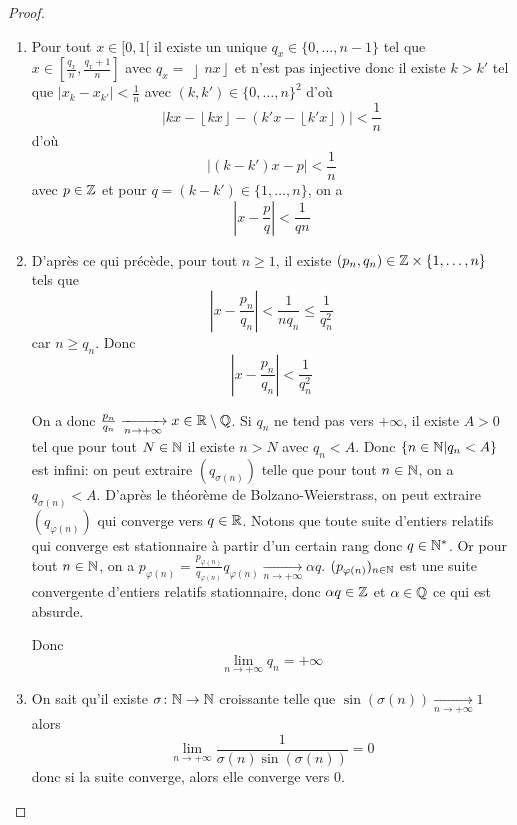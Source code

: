 \begin{proof}
	\phantom{}
	\begin{enumerate}
		\item Pour tout $x\in[0,1[$ il existe un unique $q_{x}\in\{0,\dots,n-1\}$ tel que $x\in[\frac{q_{x}}{n},\frac{q_{x}+1}{n}]$ avec $q_{x}=\left\rfloor nx\right\rfloor$ et 
		n'est pas injective donc il existe $k>k'$ tel que $\vert x_{k}-x_{k'}\vert<\frac{1}{n}$ avec $(k,k')\in\{0,\dots,n\}^{2}$ d'où
		$$\left\vert kx-\left\lfloor kx\right\rfloor-\left(k'x-\left\lfloor k'x\right\rfloor\right)\right\vert<\frac{1}{n}$$
		d'où 
		$$\left\vert (k-k')x-p\right\vert<\frac{1}{n}$$
		avec $p\in\mathbb{Z}$ et pour $q=(k-k')\in\{1,\dots,n\}$, on a 
		$$\boxed{\left\vert x-\frac{p}{q}\right\vert<\frac{1}{qn}}$$

		\item D'après ce qui précède, pour tout $n\geqslant1$, il existe $(p_{n},q_{n})\in\mathbb{Z}\times\{1,\dots,n\}$ tels que 
		$$\left\vert x-\frac{p_{n}}{q_{n}}\right\vert<\frac{1}{nq_{n}}\leqslant\frac{1}{q_{n}^{2}}$$
		car $n\geqslant q_{n}$.
		Donc 
		$$\boxed{\left\vert x-\frac{p_{n}}{q_{n}}\right\vert<\frac{1}{q_{n}^{2}}}$$

		On a donc $\frac{p_{n}}{q_{n}}\xrightarrow[n\to+\infty]{}x\in\mathbb{R}\setminus\mathbb{Q}$. Si $q_{n}$ ne tend pas vers $+\infty$, il existe $A>0$ tel que pour tout $N\in\mathbb{N}$ il existe $n>N$ avec $q_{n}<A$. Donc $\{n\in\mathbb{N}|q_{n}<A\}$ est infini: on peut extraire $(q_{\sigma(n)})$ telle que pour tout $n\in\mathbb{N}$, on a $q_{\sigma(n)}<A$. D'après le théorème de Bolzano-Weierstrass, on peut extraire $(q_{\varphi(n)})$ qui converge vers $q\in\mathbb{R}$. Notons que toute suite d'entiers relatifs qui converge est stationnaire à partir d'un certain rang donc $q\in\mathbb{N}^{*}$. Or pour tout $n\in\mathbb{N}$, on a $p_{\varphi(n)}=\frac{p_{\varphi(n)}}{q_{\varphi(n)}}q_{\varphi(n)}\xrightarrow[n\to+\infty]{}\alpha q$. $(p_{\varphi(n)})_{n\in\mathbb{N}}$ est une suite convergente d'entiers relatifs stationnaire, donc $\alpha q\in\mathbb{Z}$ et $\alpha\in\mathbb{Q}$ ce qui est absurde.

		Donc 
		$$\boxed{\lim\limits_{n\to+\infty}q_{n}=+\infty}$$

		\item On sait qu'il existe $\sigma\colon\mathbb{N}\to\mathbb{N}$ croissante telle que $\sin\left(\sigma(n)\right)\xrightarrow[n\to+\infty]{}1$ alors 
		$$\lim\limits_{n\to+\infty}\frac{1}{\sigma(n)\sin(\sigma(n))}=0$$
		donc si la suite converge, alors elle converge vers 0.


\end{enumerate}
\end{proof}
